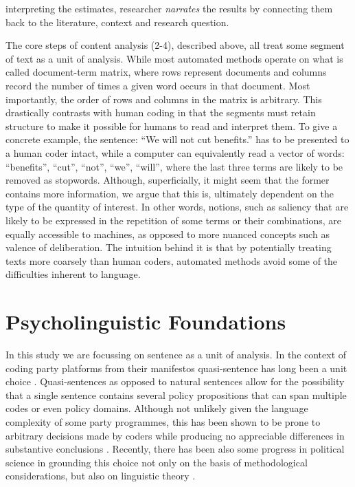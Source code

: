 \documentclass[a4paper, 12pt]{article}
\begin{document}
interpreting the estimates, researcher \textit{narrates} the results by connecting them back to the literature, context and research question.

The core steps of content analysis (2-4), described above, all treat some segment of text as a unit of analysis. While most automated methods operate on what is called document-term matrix, where rows represent documents and columns record the number of times a given word occurs in that document. Most importantly, the order of rows and columns in the matrix is arbitrary. This drastically contrasts with human coding in that the segments must retain structure to make it possible for humans to read and interpret them. To give a concrete example, the sentence: \enquote{We will not cut benefits.} has to be presented to a human coder intact, while a computer can equivalently read a vector of words: \enquote{benefits}, \enquote{cut}, \enquote{not},  \enquote{we}, \enquote{will}, where the last three terms are likely to be removed as stopwords. Although, superficially, it might seem that the former contains more information, we argue that this is, ultimately dependent on the type of the quantity of interest. In other words, notions, such as saliency that are likely to be expressed in the repetition of some terms or their combinations, are equally accessible to machines, as opposed to more nuanced concepts such as valence of deliberation. The intuition behind it is that by potentially treating texts more coarsely than human coders, automated methods avoid some of the difficulties inherent to language.

\section{Psycholinguistic Foundations}
In this study we are focussing on sentence as a unit of analysis. In the context of coding party platforms from their manifestos quasi-sentence has long been a unit choice \citep{Volkens2013}. Quasi-sentences as opposed to natural sentences allow for the possibility that a single sentence contains several policy propositions that can span multiple codes or even policy domains. Although not unlikely given the language complexity of some party programmes, this has been shown to be prone to arbitrary decisions made by coders while producing no appreciable differences in substantive conclusions \citep{Daubler2012}. Recently, there has been also some progress in political science in grounding this choice not only on the basis of methodological considerations, but also on linguistic theory \citep{Dolezal2016a}.
\end{document}
